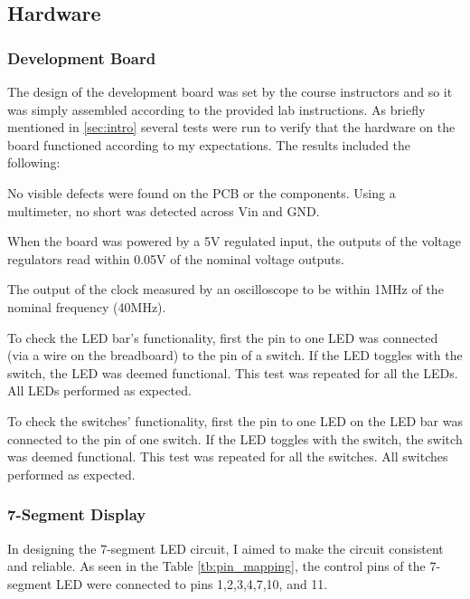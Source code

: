 \documentclass[11pt]{article}
\begin{document}
\subsection{Hardware}

\subsubsection{Development Board}

The design of the development board was set by the course instructors and so it was simply assembled according to the provided lab instructions. As briefly mentioned in \ref{sec:intro} several tests were run to verify that the hardware on the board functioned according to my expectations. The results included the following:

	\begin{description} \itemsep0pt
		\item[Pre-assembly Inspection ] No visible defects were found on the PCB or the components. Using a multimeter, no short was detected across Vin and GND.
		\item[Power Supply ] When the board was powered by a 5V regulated input, the outputs of the voltage regulators read within 0.05V of the nominal voltage outputs. 
		\item[Clock ] The output of the clock measured by an oscilloscope to be within 1MHz of the nominal frequency (40MHz).
		\item[LED Bar ] To check the LED bar's functionality, first the pin to one LED was connected (via a wire on the breadboard) to the pin of a switch. If the LED toggles with the switch, the LED was deemed functional. This test was repeated for all the LEDs. All LEDs performed as expected.
		\item[Switches ] To check the switches' functionality, first the pin to one LED on the LED bar was connected to the pin of one switch. If the LED toggles with the switch, the switch was deemed functional. This test was repeated for all the switches. All switches performed as expected.
		
		
	\end{description}


\subsubsection{7-Segment Display}




In designing the 7-segment LED circuit, I aimed to make the circuit consistent and reliable. As seen in the Table \ref{tb:pin_mapping}, the control pins of the 7-segment LED were connected to pins 1,2,3,4,7,10, and 11. 
\end{document}
